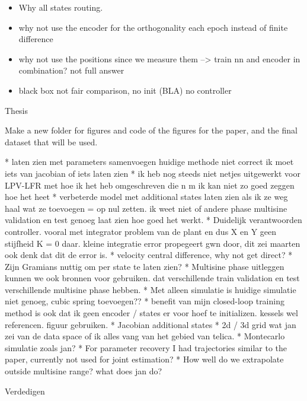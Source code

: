 \begin{wip}
\begin{itemize}
    \item Why all states routing.
    \item why not use the encoder for the orthogonality each epoch instead of finite difference
    \item why not use the positions since we measure them --> train nn and encoder in combination? not full answer
    \item black box not fair comparison, no init (BLA) no controller
\end{itemize}

Thesis

Make a new folder for figures and code of the figures for the paper, and the final dataset that will be used.



* laten zien met parameters samenvoegen huidige methode niet correct ik moet iets van jacobian of iets laten zien
* ik heb nog steeds niet netjes uitgewerkt voor LPV-LFR met hoe ik het heb omgeschreven die n m ik kan niet zo goed zeggen hoe het heet
* verbeterde model met additional states laten zien als ik ze weg haal wat ze toevoegen = op nul zetten. ik weet niet of andere phase multisine validation en test genoeg laat zien hoe goed het werkt.
* Duidelijk verantwoorden controller. vooral met integrator problem van de plant en dus X en Y geen stijfheid K = 0 daar. kleine integratie error propegeert gwn door, dit zei maarten ook denk dat dit de error is.
* velocity central difference, why not get direct?
* Zijn Gramians nuttig om per state te laten zien?
* Multisine phase uitleggen kunnen we ook bronnen voor gebruiken. dat verschillende train validation en test verschillende multisine phase hebben.
* Met alleen simulatie is huidige simulatie niet genoeg, cubic spring toevoegen??
* benefit van mijn closed-loop training method is ook dat ik geen encoder / states er voor hoef te initializen. kessels wel referencen. figuur gebruiken.
* Jacobian additional states
* 2d / 3d grid wat jan zei van de data space of ik alles vang van het gebied van telica.
* Montecarlo simulatie zoals jan?
* For parameter recovery I had trajectories similar to the paper, currently not used for joint estimation?
* How well do we extrapolate outside multisine range? what does jan do?





Verdedigen


\end{wip}
